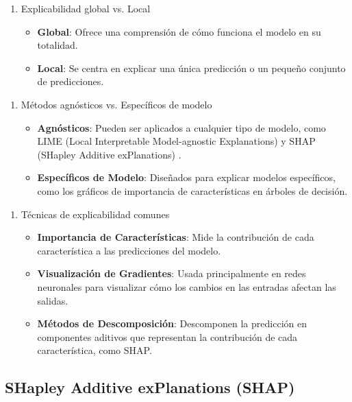 \begin{enumerate}
    \item{Explicabilidad global vs. Local}
    \begin{itemize}
        \item \textbf{Global}: Ofrece una comprensión de cómo funciona el modelo en su totalidad.
        \item \textbf{Local}: Se centra en explicar una única predicción o un pequeño conjunto de predicciones.
    \end{itemize}
\end{enumerate}


\begin{enumerate}
    \item{Métodos agnósticos vs. Específicos de modelo}
    \begin{itemize}
        \item \textbf{Agnósticos}: Pueden ser aplicados a cualquier tipo de modelo, como LIME (Local Interpretable Model-agnostic Explanations) y SHAP (SHapley Additive exPlanations) \cite{ribeiro2016why}.
        \item \textbf{Específicos de Modelo}: Diseñados para explicar modelos específicos, como los gráficos de importancia de características en árboles de decisión.
    \end{itemize}
\end{enumerate}


\begin{enumerate}
    \item{Técnicas de explicabilidad comunes}
    \begin{itemize}
        \item \textbf{Importancia de Características}: Mide la contribución de cada característica a las predicciones del modelo.
        \item \textbf{Visualización de Gradientes}: Usada principalmente en redes neuronales para visualizar cómo los cambios en las entradas afectan las salidas.
        \item \textbf{Métodos de Descomposición}: Descomponen la predicción en componentes aditivos que representan la contribución de cada característica, como SHAP.
    \end{itemize}
\end{enumerate}

\vspace{2mm}



\subsection{SHapley Additive exPlanations (SHAP)}

